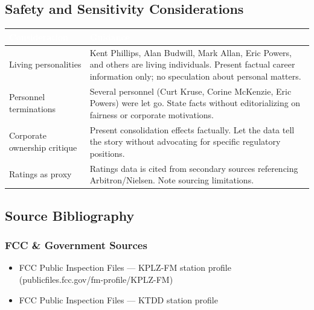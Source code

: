 \documentclass[11pt,letterpaper]{article}
\newcommand{\tableheader}[1]{\textbf{\sffamily\textcolor{white}{#1}}}
\begin{document}
\subsection{Safety and Sensitivity Considerations}

\begin{center}
\begin{tabularx}{\textwidth}{L{3.5cm}X}
\toprule
{}
\tableheader{Consideration} & \tableheader{Guidance} \\
\midrule
Living personalities & Kent Phillips, Alan Budwill, Mark Allan, Eric Powers, and others are living individuals. Present factual career information only; no speculation about personal matters. \\
Personnel terminations & Several personnel (Curt Kruse, Corine McKenzie, Eric Powers) were let go. State facts without editorializing on fairness or corporate motivations. \\
Corporate ownership critique & Present consolidation effects factually. Let the data tell the story without advocating for specific regulatory positions. \\
Ratings as proxy & Ratings data is cited from secondary sources referencing Arbitron/Nielsen. Note sourcing limitations. \\
\bottomrule
\end{tabularx}
\end{center}

\subsection{Source Bibliography}

\subsubsection{FCC \& Government Sources}
\begin{itemize}[leftmargin=2em]
\item FCC Public Inspection Files --- KPLZ-FM station profile (publicfiles.fcc.gov/fm-profile/KPLZ-FM)
\item FCC Public Inspection Files --- KTDD station profile
\end{itemize}
\end{document}
